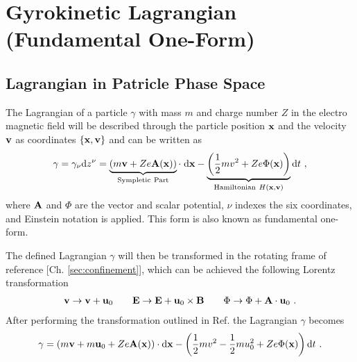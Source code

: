 \newpage
\section{Gyrokinetic Lagrangian (Fundamental One-Form)}
\label{sec:lagrangian}

\subsection{Lagrangian in Patricle Phase Space}
\label{sub:particleLagrangian}

The Lagrangian of a particle $\gamma$ with mass $m$ and charge number $Z$ in the electro magnetic field will be described through the particle position $\boldsymbol{\mathbf{x}}$ and the velocity $\boldsymbol{\mathbf{v}}$ as coordinates $\{\boldsymbol{\mathbf{x}}, \boldsymbol{\mathbf{v}} \}$ and can be written as
\begin{gather}
    \gamma = \gamma_\nu \mathrm{d}z^\nu = \underbrace{\left(m\boldsymbol{\mathbf{v}} + Ze\boldsymbol{\mathbf{A}}(\boldsymbol{\mathbf{x}}) \right)}_{\mathrm{Sympletic~Part}}\cdot\;\mathrm{d}\boldsymbol{\mathbf{x}} - \underbrace{\left(\frac{1}{2}mv^2 + Ze\Phi(\boldsymbol{\mathbf{x}})\right)}_{\mathrm{Hamiltonian}~H(\boldsymbol{\mathbf{x}},\boldsymbol{\mathbf{v}})} \mathrm{d}t ~,
    \label{eq:particleLagrangian}
\end{gather}
where $\boldsymbol{\mathbf{A}}$ and $\Phi$ are the vector and scalar potential, $\nu$ indexes the six coordinates, and Einstein notation is applied. This form is also known as fundamental one-form. \bigskip

The defined Lagrangian $\gamma$ will then be transformed in the rotating frame of reference [Ch. \ref{sec:confinement}], which can be achieved the following Lorentz transformation
\begin{gather}
    \boldsymbol{\mathbf{v}} \rightarrow \boldsymbol{\mathbf{v}} + \boldsymbol{\mathbf{u}}_0 \qquad \boldsymbol{\mathbf{E}} \rightarrow \boldsymbol{\mathbf{E}} + \boldsymbol{\mathbf{u}}_0 \times \boldsymbol{\mathbf{B}} \qquad \Phi \rightarrow \Phi + \boldsymbol{\mathbf{A}} \cdot \boldsymbol{\mathbf{u}}_0 ~.
\end{gather}
After performing the transformation outlined in Ref.  the Lagrangian $\gamma$ becomes
\begin{gather}
    \gamma = \left(m\boldsymbol{\mathbf{v}} + m\boldsymbol{\mathbf{u}}_0 + Ze\boldsymbol{\mathbf{A}}(\boldsymbol{\mathbf{x}}) \right) \cdot \mathrm{d}\boldsymbol{\mathbf{x}} - \left(\frac{1}{2}mv^2 - \frac{1}{2}mu_0^2 + Ze\Phi(\boldsymbol{\mathbf{x}})\right) \mathrm{d}t ~.
    \label{eq:particleLagrangian}
\end{gather} 

